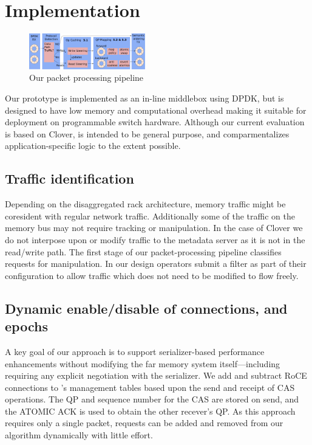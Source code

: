 \section{Implementation}

\begin{figure}
    \includegraphics[width=0.45\textwidth]{fig/packet_processing.pdf}
    \caption{Our packet processing pipeline}
    \label{fig:system}
\end{figure}

Our {\sword} prototype is implemented as an in-line middlebox using DPDK,
but is designed to have low memory and computational overhead making
it suitable for deployment on programmable switch hardware.  Although
our current evaluation is based on Clover, {\sword} is intended to be
general purpose, and comparmentalizes application-specific logic to
the extent possible.



\subsection{Traffic identification} Depending on the disaggregated
rack architecture, memory traffic might be coresident with regular
network traffic.  Additionally some of the traffic on the memory bus
may not require tracking or manipulation. In the case of Clover we do
not interpose upon or modify traffic to the metadata server as it is
not in the read/write path. The first stage of our packet-processing
pipeline classifies requests for manipulation. In our design operators
submit a filter as part of their configuration to allow traffic which does
not need to be modified to flow freely.

\subsection{Dynamic enable/disable of connections, and epochs}

A key goal of our approach is to support serializer-based performance
enhancements without modifying the far memory system
itself---including requiring any explicit negotiation with the
serializer.
We add and subtract RoCE connections to {\sword}'s management tables
based upon the send and receipt of CAS operations. The QP and
sequence number for the CAS are stored on send, and the ATOMIC ACK is
used to obtain the other recever's QP. As this approach requires only
a single packet, requests can be added and removed from our algorithm
dynamically with little effort.

